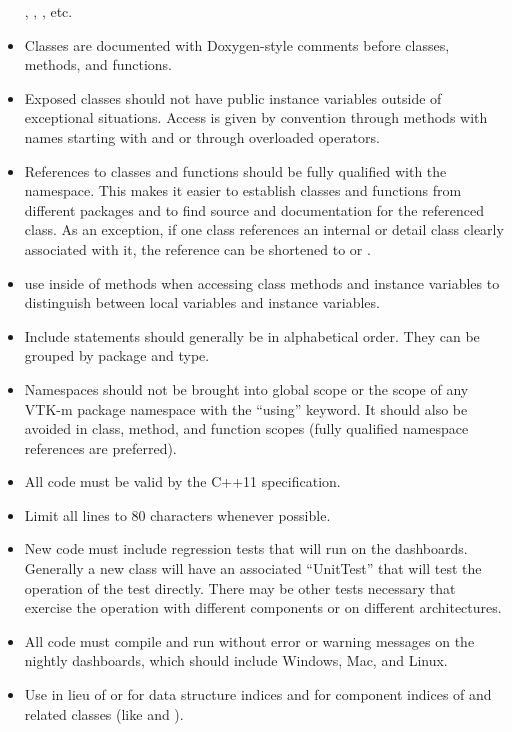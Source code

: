 \begin{itemize}
  , , ,
  etc.
\item Classes are documented with Doxygen-style comments before classes,
  methods, and functions.
\item Exposed classes should not have public instance variables outside of
  exceptional situations. Access is given by convention through methods
  with names starting with  and  or through
  overloaded operators.
\item References to classes and functions should be fully qualified with
  the namespace. This makes it easier to establish classes and functions
  from different packages and to find source and documentation for the
  referenced class. As an exception, if one class references an internal or
  detail class clearly associated with it, the reference can be shortened
  to  or .
\item use  inside of methods when accessing class methods
  and instance variables to distinguish between local variables and
  instance variables.
\item Include statements should generally be in alphabetical order. They
  can be grouped by package and type.
\item Namespaces should not be brought into global scope or the scope of
  any VTK-m package namespace with the ``using'' keyword. It should also be
  avoided in class, method, and function scopes (fully qualified namespace
  references are preferred).
\item All code must be valid by the C++11 specification.
\item Limit all lines to 80 characters whenever possible.
\item New code must include regression tests that will run on the
  dashboards. Generally a new class will have an associated ``UnitTest''
  that will test the operation of the test directly. There may be other
  tests necessary that exercise the operation with different components or
  on different architectures.
\item All code must compile and run without error or warning messages on
  the nightly dashboards, which should include Windows, Mac, and Linux.
\item Use  in lieu of  or  for data
  structure indices and  for component indices of
   and related classes (like  and
  ).

\end{itemize}
